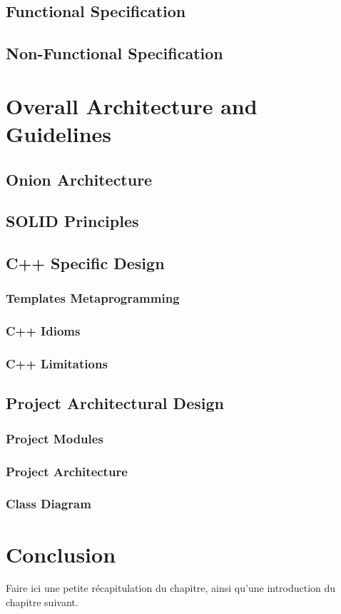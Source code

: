 \begin{spacing}{1.2}
    \subsection{Functional Specification}
    \subsection{Non-Functional Specification}
    \section{Overall Architecture and Guidelines}
    \subsection{Onion Architecture}
    \subsection{SOLID Principles}
    \subsection{C++ Specific Design}
    \subsubsection{Templates Metaprogramming}
    \subsubsection{C++ Idioms}
    \subsubsection{C++ Limitations}
    \subsection{Project Architectural Design}
    \subsubsection{Project Modules}
    \subsubsection{Project Architecture}
    \subsubsection{Class Diagram}


    \section*{Conclusion}
    Faire ici une petite récapitulation du chapitre, ainsi qu'une introduction du chapitre suivant.





\end{spacing}
